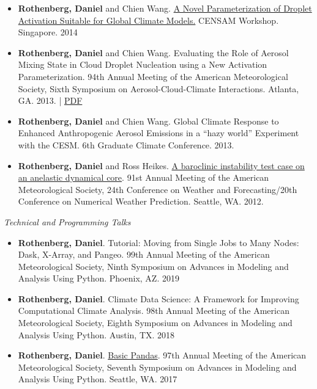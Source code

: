 \documentclass[11pt,letterpaper]{article}
\begin{document}
\begin{itemize}[itemindent=-10pt]
 \item \textbf{Rothenberg, Daniel} and Chien Wang. \href{http://figshare.com/articles/A_Novel_Parameterization_of_Droplet_Activation_Suitable_for_Global_Climate_Models/1085984}{A Novel Parameterization of Droplet Activation Suitable for Global Climate Models.} CENSAM Workshop. Singapore. 2014

 \item \textbf{Rothenberg, Daniel} and Chien Wang. Evaluating the Role of Aerosol Mixing State in Cloud Droplet Nucleation using a New Activation Parameterization. 94th Annual Meeting of the American Meteorological Society, Sixth Symposium on Aerosol-Cloud-Climate Interactions. Atlanta, GA. 2013. | \href{https://figshare.com/articles/AMS_2014_Evaluating_the_Role_of_Aerosol_Mixing_State_in_Cloud_Droplet_Nucleation_towards_Developing_a_New_Activation_Parameterization/918655}{PDF}

 \item \textbf{Rothenberg, Daniel} and Chien Wang. Global Climate Response to Enhanced Anthropogenic Aerosol Emissions in a ``hazy world'' Experiment with the CESM. 6th Graduate Climate Conference. 2013.

 \item \textbf{Rothenberg, Daniel} and Ross Heikes. \href{https://ams.confex.com/ams/91Annual/webprogram/Paper180796.html}{A baroclinic instability test case on an anelastic dynamical core}. 91st Annual Meeting of the American Meteorological Society, 24th Conference on Weather and Forecasting/20th Conference on Numerical Weather Prediction. Seattle, WA. 2012.
\end{itemize}

\bigskip
\emph{Technical and Programming Talks}
\medskip
\begin{itemize}[itemindent=-10pt]

 \item \textbf{Rothenberg, Daniel}. Tutorial: Moving from Single Jobs to Many Nodes: Dask, X-Array, and Pangeo. 99th Annual Meeting of the American Meteorological Society, Ninth Symposium on Advances in Modeling and Analysis Using Python. Phoenix, AZ. 2019

 \item \textbf{Rothenberg, Daniel}. Climate Data Science: A Framework for Improving Computational Climate Analysis. 98th Annual Meeting of the American Meteorological Society, Eighth Symposium on Advances in Modeling and Analysis Using Python. Austin, TX. 2018

 \item \textbf{Rothenberg, Daniel}. \href{https://github.com/darothen/python_for_climate_data_science/blob/master/basic_pandas.ipynb}{Basic Pandas}. 97th Annual Meeting of the American Meteorological Society, Seventh Symposium on Advances in Modeling and Analysis Using Python. Seattle, WA. 2017

\end{itemize}
\end{document}
